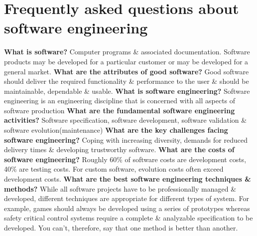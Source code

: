 \documentclass{report}
\begin{document}
\section{Frequently asked questions about software engineering}
\noindent \textbf{What is software?}\newline
  Computer programs \& associated documentation. Software products may be developed for a particular customer or may be developed for a general market.
\newline\newline
\textbf{What are the attributes of good software?}\newline
  Good software should deliver the required functionality \& performance to the user \& should be maintainable, dependable \& usable.
\newline\newline
\textbf{What is software engineering?}\newline
Software engineering is an engineering discipline that is
concerned with all aspects of software production
\newline\newline
\textbf{What are the fundamental software engineering activities?}\newline
Software specification, software development, software
validation \& software evolution(maintenance)
\newline\newline
\textbf{What are the key challenges facing software engineering?}\newline
Coping with increasing diversity, demands for reduced delivery times \& developing trustworthy software.
\newline\newline
\textbf{What are the costs of software engineering?}\newline
Roughly 60\% of software costs are development costs, 40\% are testing costs. For custom software, evolution costs often exceed development costs.
\newline\newline
\textbf{What are the best software engineering techniques \& methods?}\newline
While all software projects have to be professionally managed \& developed, different techniques are appropriate for different types of system. For example, games should always be developed using a series of prototypes whereas safety critical control systems require a complete \& analyzable specification to be developed. You can’t, therefore, say that one method is better than another.
\end{document}

